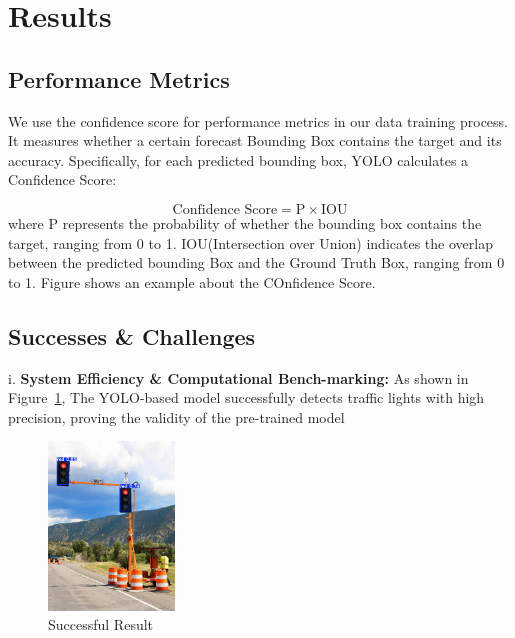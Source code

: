 \documentclass[journal,transmag]{IEEEtran}
\begin{document}
\section{Results}

\subsection{Performance Metrics}
We use the confidence score for performance metrics in our data training process. It measures whether a certain forecast Bounding Box contains the target and its accuracy. Specifically, for each predicted bounding box, YOLO calculates a Confidence Score:

\begin{equation}
  \text{Confidence Score} = \text{P} \times \text{IOU}
\end{equation}
where $\text{P}$ represents the probability of whether the bounding box contains the target, ranging from 0 to 1. IOU(Intersection over Union) indicates the overlap between the predicted bounding Box and the Ground Truth Box, ranging from 0 to 1. Figure shows an example about the COnfidence Score. 


\subsection{Successes \& Challenges}
\vspace{2mm}

i. \textbf{System Efficiency \& Computational Bench-marking:}
As shown in Figure~\ref{fig:successful}, The YOLO-based model successfully detects traffic lights with high precision, proving the validity of the pre-trained model 
\begin{figure}[h]
    \centering
    \includegraphics[width=0.3\textwidth]{Result_5.png}
    \caption{Successful Result}
    \label{fig:successful}
\end{figure}
\end{document}
